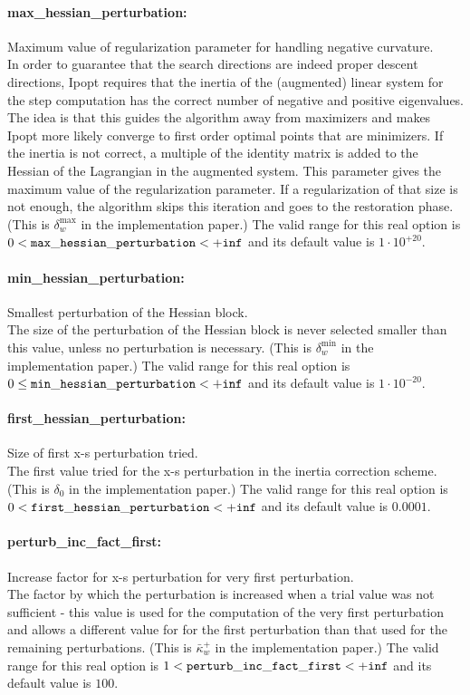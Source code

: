 \paragraph{max\_hessian\_perturbation:} Maximum value of regularization parameter for handling negative curvature. $\;$ \\
 In order to guarantee that the search directions
are indeed proper descent directions, Ipopt
requires that the inertia of the (augmented)
linear system for the step computation has the
correct number of negative and positive
eigenvalues. The idea is that this guides the
algorithm away from maximizers and makes Ipopt
more likely converge to first order optimal
points that are minimizers. If the inertia is not
correct, a multiple of the identity matrix is
added to the Hessian of the Lagrangian in the
augmented system. This parameter gives the
maximum value of the regularization parameter. If
a regularization of that size is not enough, the
algorithm skips this iteration and goes to the
restoration phase. (This is $\delta_w^{\max}$ in the
implementation paper.) The valid range for this real option is 
$0 <  {\tt max\_hessian\_perturbation } <  {\tt +inf}$
and its default value is $1 \cdot 10^{+20}$.


\paragraph{min\_hessian\_perturbation:} Smallest perturbation of the Hessian block. $\;$ \\
 The size of the perturbation of the Hessian block
is never selected smaller than this value, unless
no perturbation is necessary. (This is
$\delta_w^{\min}$ in the implementation paper.) The valid range for this real option is 
$0 \le {\tt min\_hessian\_perturbation } <  {\tt +inf}$
and its default value is $1 \cdot 10^{-20}$.


\paragraph{first\_hessian\_perturbation:} Size of first x-s perturbation tried. $\;$ \\
 The first value tried for the x-s perturbation in
the inertia correction scheme.(This is $\delta_0$
in the implementation paper.) The valid range for this real option is 
$0 <  {\tt first\_hessian\_perturbation } <  {\tt +inf}$
and its default value is $0.0001$.


\paragraph{perturb\_inc\_fact\_first:} Increase factor for x-s perturbation for very first perturbation. $\;$ \\
 The factor by which the perturbation is increased
when a trial value was not sufficient - this
value is used for the computation of the very
first perturbation and allows a different value
for for the first perturbation than that used for
the remaining perturbations. (This is
$\bar\kappa_w^+$ in the implementation paper.) The valid range for this real option is 
$1 <  {\tt perturb\_inc\_fact\_first } <  {\tt +inf}$
and its default value is $100$.



